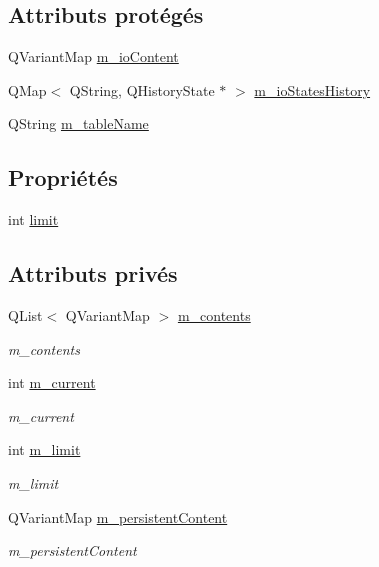 \subsection*{Attributs protégés}
\begin{DoxyCompactItemize}
\item 
Q\-Variant\-Map \hyperlink{classSimpleHotel_1_1SH__InOutStateMachine_a4b0a3a48b0da31fddb724a357ad9b52c}{m\-\_\-io\-Content}
\item 
Q\-Map$<$ Q\-String, Q\-History\-State $\ast$ $>$ \hyperlink{classSimpleHotel_1_1SH__InOutStateMachine_a45a7defb15e50a196bc471017fc86eb4}{m\-\_\-io\-States\-History}
\item 
Q\-String \hyperlink{classSimpleHotel_1_1SH__InOutStateMachine_a15c063debdaa4c87bd4925867a13ce9e}{m\-\_\-table\-Name}
\end{DoxyCompactItemize}
\subsection*{Propriétés}
\begin{DoxyCompactItemize}
\item 
int \hyperlink{classSimpleHotel_1_1SH__LoopingInOutStateMachine_a5039255365e39a63520818168200b686}{limit}
\end{DoxyCompactItemize}
\subsection*{Attributs privés}
\begin{DoxyCompactItemize}
\item 
Q\-List$<$ Q\-Variant\-Map $>$ \hyperlink{classSimpleHotel_1_1SH__LoopingInOutStateMachine_a46c3dab932ceedeef821a25fa8d6e5dd}{m\-\_\-contents}
\begin{DoxyCompactList}\small\item\em m\-\_\-contents \end{DoxyCompactList}\item 
int \hyperlink{classSimpleHotel_1_1SH__LoopingInOutStateMachine_a700a3c54ef593c94815a0418d83dd381}{m\-\_\-current}
\begin{DoxyCompactList}\small\item\em m\-\_\-current \end{DoxyCompactList}\item 
int \hyperlink{classSimpleHotel_1_1SH__LoopingInOutStateMachine_ae5e496343aed89d7062e2478218f4e7d}{m\-\_\-limit}
\begin{DoxyCompactList}\small\item\em m\-\_\-limit \end{DoxyCompactList}\item 
Q\-Variant\-Map \hyperlink{classSimpleHotel_1_1SH__LoopingInOutStateMachine_a6ed5f5c62373711ce123fb1a97fc3387}{m\-\_\-persistent\-Content}
\begin{DoxyCompactList}\small\item\em m\-\_\-persistent\-Content \end{DoxyCompactList}\end{DoxyCompactItemize}


